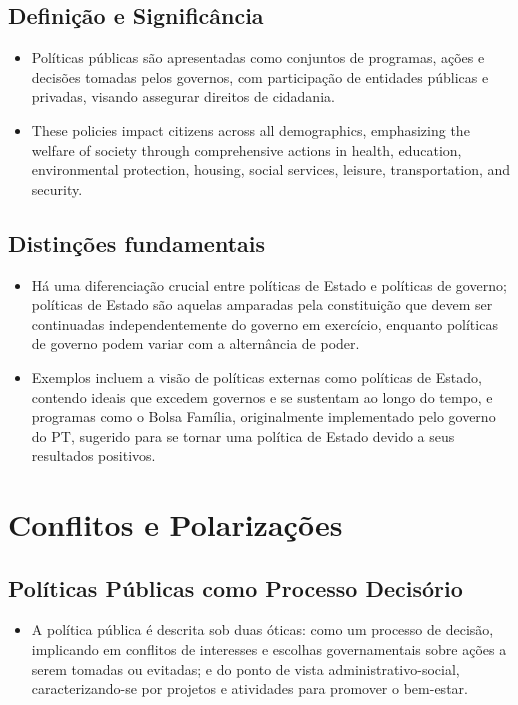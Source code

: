 \documentclass[
   article,       
   12pt,          
   oneside,       
   a4paper,       
   english,       
   brazil,        
   sumario=tradicional
   ]{abntex2}
\begin{document}
\subsection{Definição e Significância}
\begin{itemize}
    \item Políticas públicas são apresentadas como conjuntos de programas, ações e decisões tomadas pelos governos, com participação de entidades públicas e privadas, visando assegurar direitos de cidadania.
    \item These policies impact citizens across all demographics, emphasizing the welfare of society through comprehensive actions in health, education, environmental protection, housing, social services, leisure, transportation, and security.
\end{itemize}

\subsection{Distinções fundamentais}
\begin{itemize}
    \item Há uma diferenciação crucial entre políticas de Estado e políticas de governo; políticas de Estado são aquelas amparadas pela constituição que devem ser continuadas independentemente do governo em exercício, enquanto políticas de governo podem variar com a alternância de poder.
    \item Exemplos incluem a visão de políticas externas como políticas de Estado, contendo ideais que excedem governos e se sustentam ao longo do tempo, e programas como o Bolsa Família, originalmente implementado pelo governo do PT, sugerido para se tornar uma política de Estado devido a seus resultados positivos.
\end{itemize}

\section{Conflitos e Polarizações}

\subsection{Políticas Públicas como Processo Decisório}
\begin{itemize}
    \item A política pública é descrita sob duas óticas: como um processo de decisão, implicando em conflitos de interesses e escolhas governamentais sobre ações a serem tomadas ou evitadas; e do ponto de vista administrativo-social, caracterizando-se por projetos e atividades para promover o bem-estar.
\end{itemize}
\end{document}
